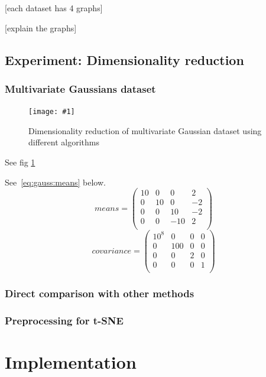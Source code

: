 \documentclass[12pt,a4paper]{report}
\newcommand{\cenfig}[3]{
\begin{figure}[ht]
	\centering
    \texttt{[image: \#1]}
    \caption{#2} \label{#3}
\end{figure}
}
\begin{document}
[each dataset has 4 graphs]

[explain the graphs]

\section{Experiment: Dimensionality reduction} \label{chap:exp:dimred}

\subsection{Multivariate Gaussians dataset} \label{chap:trivial-dataset}

\cenfig{graphs/dimred/gaussians}{Dimensionality reduction of multivariate Gaussian dataset using different algorithms}{fig:dimred:gauss}

See fig \ref{fig:dimred:gauss}

See~\eqref{eq:gauss:means} below.
\begin{equation} \label{eq:gauss:means}
means = \begin{pmatrix}
10 & 0 & 0 & 2 \\
0 & 10 & 0 & -2 \\
0 & 0 & 10 & -2 \\
0 & 0 & -10 & 2 \\
\end{pmatrix}
\end{equation}
\begin{equation} \label{eq:gauss:cov}
covariance = \begin{pmatrix}
10^8 & 0 & 0 & 0 \\
0 & 100 & 0 & 0 \\
0 & 0 & 2 & 0 \\
0 & 0 & 0 & 1 \\
\end{pmatrix}
\end{equation}

\subsection{Direct comparison with other methods}

\subsection{Preprocessing for t-SNE}


\chapter{Implementation} \label{chap:impl}
\end{document}
